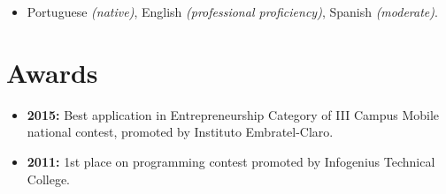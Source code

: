 \documentclass[11pt,a4paper,sans]{moderncv}        %
\begin{document}
\vspace{6pt}

\begin{itemize}

\item{Portuguese \textit{(native)}, English \textit{(professional proficiency)}, Spanish \textit{(moderate)}.}

\end{itemize}

\section{Awards}

\vspace{6pt}
 
\begin{itemize}

\item{\textbf{2015:} Best application in Entrepreneurship Category of III Campus Mobile national contest, promoted by Instituto Embratel-Claro.}

\item{\textbf{2011:} 1st place on programming contest promoted by Infogenius Technical College.}

\end{itemize}

\nocite{*}



\end{document}

